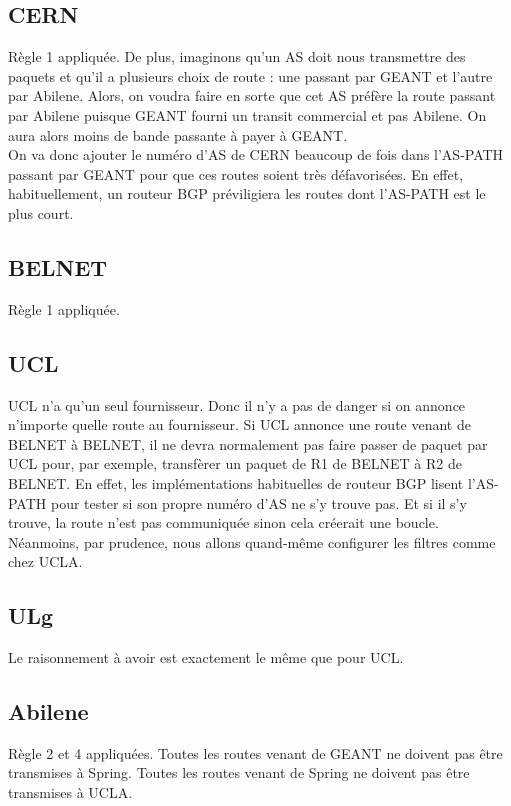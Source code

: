 \documentclass[a4paper, 12pt]{article}
\begin{document}
\subsection{CERN}
Règle 1 appliquée. De plus,
imaginons qu'un AS doit nous transmettre des paquets et qu'il a plusieurs choix de route : une passant par GEANT et l'autre par Abilene.
Alors, on voudra faire en sorte que cet AS préfère la route passant par Abilene puisque GEANT fourni un transit commercial et pas Abilene.
On aura alors moins de bande passante à payer à GEANT.
\\

On va donc ajouter le numéro d'AS de CERN beaucoup de fois dans l'AS-PATH passant par GEANT pour que ces routes soient très défavorisées.
En effet, habituellement, un routeur BGP préviligiera les routes dont l'AS-PATH est le plus court. 


\subsection{BELNET}
Règle 1 appliquée.

\subsection{UCL}
UCL n'a qu'un seul fournisseur. Donc il n'y a pas de danger si on annonce n'importe quelle route au fournisseur.
Si UCL annonce une route venant de BELNET à BELNET, il ne devra normalement pas faire passer de paquet par UCL pour, par exemple, transfèrer un paquet de R1 de BELNET à R2 de BELNET.
En effet, les implémentations habituelles de routeur BGP lisent l'AS-PATH pour tester si son propre numéro d'AS ne s'y trouve pas.
Et si il s'y trouve, la route n'est pas communiquée sinon cela créerait une boucle.
Néanmoins, par prudence, nous allons quand-même configurer les filtres comme chez UCLA.

\subsection{ULg}
Le raisonnement à avoir est exactement le même que pour UCL.

\subsection{Abilene}
Règle 2 et 4 appliquées. Toutes les routes venant de GEANT ne doivent pas être transmises à Spring. Toutes les routes venant de Spring ne doivent pas être transmises à UCLA.
\end{document}
